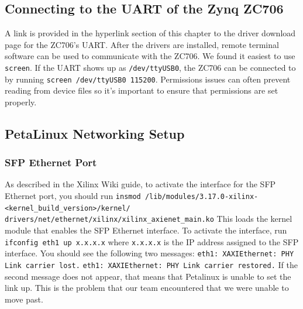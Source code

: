 \documentclass[12pt]{report}
\begin{document}
\subsection{Connecting to the UART of the Zynq ZC706}
A link is provided in the hyperlink section of this chapter to the driver download page for the ZC706's UART. After the drivers are installed, remote terminal software can be used to communicate with the ZC706. We found it easiest to use \texttt{screen}. If the UART shows up as \texttt{/dev/ttyUSB0}, the ZC706 can be connected to by running \texttt{screen /dev/ttyUSB0 115200}. Permissions issues can often prevent reading from device files so it's important to ensure that permissions are set properly.

\subsection{PetaLinux Networking Setup}
\subsubsection{SFP Ethernet Port}
As described in the Xilinx Wiki guide, to activate the interface for the SFP Ethernet port, you should run
\newline \texttt{insmod /lib/modules/3.17.0-xilinx-<kernel\_build\_version>/kernel/}
\newline \texttt{drivers/net/ethernet/xilinx/xilinx\_axienet\_main.ko}
\newline This loads the kernel module that enables the SFP Ethernet interface.
\newline To activate the interface, run
\newline \texttt{ifconfig eth1 up x.x.x.x}
\newline where \texttt{x.x.x.x} is the IP address assigned to the SFP interface.
\newline You should see the following two messages:
\newline \texttt{eth1: XAXIEthernet: PHY Link carrier lost.}
\newline \texttt{eth1: XAXIEthernet: PHY Link carrier restored.}
\newline If the second message does not appear, that means that Petalinux is unable to set the link up. This is the problem that our team encountered that we were unable to move past.
\end{document}
